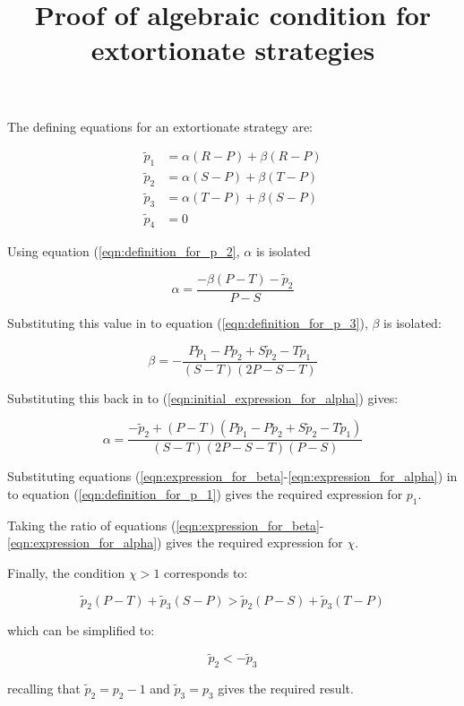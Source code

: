 \documentclass[a4]{article}
\title{Proof of algebraic condition for extortionate strategies}
\author{}
\date{}
\begin{document}
\maketitle

The defining equations for an extortionate strategy are:


\begin{align}
    \tilde p_1 & = \alpha (R - P) + \beta (R - P)\label{eqn:definition_for_p_1}\\
    \tilde p_2 & = \alpha (S - P) + \beta (T - P)\label{eqn:definition_for_p_2}\\
    \tilde p_3 & = \alpha (T - P) + \beta (S - P)\label{eqn:definition_for_p_3}\\
    \tilde p_4 & = 0
\end{align}

Using equation (\ref{eqn:definition_for_p_2}, \(\alpha\) is isolated

\begin{equation}\label{eqn:initial_expression_for_alpha}
    \alpha = \frac{-\beta (P - T) - \tilde p_2}
                  {P - S}
\end{equation}

Substituting this value in to equation (\ref{eqn:definition_for_p_3}), \(\beta\)
is isolated:

\begin{equation}\label{eqn:expression_for_beta}
    \beta = -\frac{P\tilde p_1 - P \tilde p_2 + S \tilde p_2 - T \tilde p_1}
                  {(S - T)(2 P - S - T)}
\end{equation}

Substituting this back in to (\ref{eqn:initial_expression_for_alpha}) gives:

\begin{equation}\label{eqn:expression_for_alpha}
    \alpha = \frac{-\tilde p_2 + (P - T)(P \tilde p_1 - P\tilde p_2 + S\tilde p_2 - T\tilde p_1)}
                  {(S - T)(2P - S - T)(P - S)}
\end{equation}

Substituting equations
(\ref{eqn:expression_for_beta}-\ref{eqn:expression_for_alpha}) in to
equation (\ref{eqn:definition_for_p_1}) gives the required expression for
\(p_1\).

Taking the ratio of equations
(\ref{eqn:expression_for_beta}-\ref{eqn:expression_for_alpha}) gives the
required expression for \(\chi\).

Finally, the condition \(\chi > 1\) corresponds to:


\begin{equation}
\tilde p_2 (P - T) + \tilde p_3 (S - P) >
                                      \tilde p_2 (P - S) + \tilde p_3 (T - P)
\end{equation}

which can be simplified to:

\begin{equation}
    \tilde p_2 < - \tilde p_3
\end{equation}

recalling that \(\tilde p_2 = p_2 - 1\) and \(\tilde p_3 = p_3\) gives the
required result.
\end{document}
